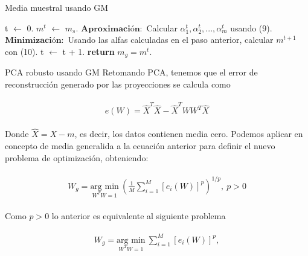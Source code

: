 \documentclass{beamer}
\begin{document}
\begin{frame}{Media muestral usando GM}
	\begin{algorithm}[H]
		\caption{Media generalizada}
		\begin{algorithmic}[1]
			\State t $\gets$ 0.
			\State $m^t$ $\gets$ $m_s$.
			\State $\textbf{Aproximación}:$ Calcular $\alpha_1^t, \alpha_2^t, ..., \alpha_m^t$ usando (9).
			\State $\textbf{Minimización}:$ Usando las alfas calculadas en el paso anterior, calcular $m^{t + 1}$ con (10).
			\State t $\gets$ t + 1.
			\EndWhile
			\State \textbf{return} $m_g = m^t$.
			\EndProcedure
		\end{algorithmic}
	\end{algorithm}
\end{frame}

\begin{frame}{PCA robusto usando GM}
	Retomando PCA, tenemos que el error de reconstrucción generado por las proyecciones se calcula como
	
	\begin{align}
	\label{eqn:eqlabel}
	\begin{split}
		e(W) = \hat{X}^T \hat{X} - \hat{X}^T W W^T \hat{X}
	\end{split}
	\end{align}
	
	Donde $\hat{X} = X - m$, es decir, los datos contienen media cero. Podemos aplicar en concepto de media generalida a la ecuación anterior para definir el nuevo problema de optimización, obteniendo:
	
	\begin{align}
	\label{eqn:eqlabel}
	\begin{split}
		W_g = \underset{W^T W = 1}{\text{arg min}}\ (\frac{1}{M} \sum_{i = 1}^M [e_i(W)]^p)^{1 / p},\ p > 0
	\end{split}
	\end{align}
	
	Como $p > 0$ lo anterior es equivalente al siguiente problema
	
	\begin{align}
	\label{eqn:eqlabel}
	\begin{split}
		W_g = \underset{W^T W = 1}{\text{arg min}}\ \sum_{i = 1}^M [e_i(W)]^p,
	\end{split}
	\end{align}
\end{frame}
\end{document}
